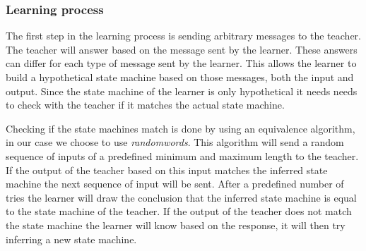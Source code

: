 \subsubsection{Learning process}
\label{preliminaries:learning:process}

The first step in the learning process is sending arbitrary messages to the teacher. The teacher will answer based on the message sent by the learner. These answers can differ for each type of message sent by the learner. This allows the learner to build a hypothetical state machine based on those messages, both the input and output.
Since the state machine of the learner is only hypothetical it needs needs to check with the teacher if it matches the actual state machine.

Checking if the state machines match is done by using an equivalence algorithm, in our case we choose to use \emph{randomwords}. This algorithm will send a random sequence of inputs of a predefined minimum and maximum length to the teacher. If the output of the teacher based on this input matches the inferred state machine the next sequence of input will be sent. After a predefined number of tries the learner will draw the conclusion that the inferred state machine is equal to the state machine of the teacher. If the output of the teacher does not match the state machine the learner will know based on the response, it will then try inferring a new state machine.

